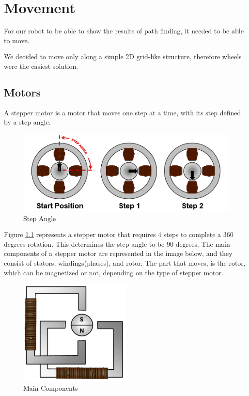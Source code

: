 \chapter{Movement}\label{ch:move}
For our robot to be able to show the results of path finding,
it needed to be able to move.

We decided to move only along a simple 2D grid-like structure,
therefore wheels were the easiest solution.

\section{Motors}\label{sec:motors}
A stepper motor is a motor that moves one step at a time, with its step defined by a step angle.

\begin{figure}[ht]
	\centering
	\includegraphics[width=\textwidth]{figures/move/motor1.png}
	\caption{Step Angle}
	\label{fig:angle} 
\end{figure}

Figure \ref{fig:angle} represents a stepper motor that requires 4 steps to complete a 360 degrees rotation. This determines the step angle to be 90 degrees.
The main components of a stepper motor are represented in the image below, and they consist of stators, windings(phases), and rotor.
The part that moves, is the rotor, which can be magnetized or not, depending on the type of stepper motor.

\begin{figure}[ht]
	\centering
	\includegraphics[width=0.5\textwidth]{figures/move/motor2.png}
	\caption{Main Components}
\end{figure}

